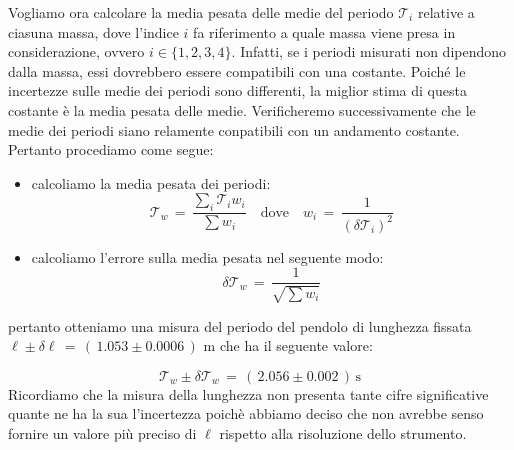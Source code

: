 Vogliamo ora calcolare la media pesata delle medie del periodo $\mathcal{T}_i$ relative a ciasuna massa, dove l'indice $i$ fa riferimento a quale massa viene presa in considerazione, ovvero $i \in \{1,2,3,4\}$.
Infatti, se i periodi misurati non dipendono dalla massa, essi dovrebbero essere compatibili con una costante.
Poiché le incertezze sulle medie dei periodi sono differenti, la miglior stima di questa costante è la media pesata delle medie.
Verificheremo successivamente che le medie dei periodi siano relamente conpatibili con un andamento costante.
Pertanto procediamo come segue:

\begin{itemize}
	\item{calcoliamo la media pesata dei periodi:
			\begin{equation*}
				\mathcal{T}_w \,=\, \frac{\sum_i \mathcal{T}_i w_i}{\sum w_i} \quad \text{dove} \quad w_i \,=\, \frac{1}{(\delta \mathcal{T}_i)^2}
			\end{equation*}
			}
	\item{calcoliamo l'errore sulla media pesata nel seguente modo:
			\begin{equation*}
				\delta \mathcal{T}_w \,=\, \frac{1}{\sqrt{\sum w_i}}
			\end{equation*}
			}
\end{itemize}
pertanto otteniamo una misura del periodo del pendolo di lunghezza fissata $\ell \pm \delta \ell \,=\, (\,1.053 \pm 0.0006\,)$ m che ha il seguente valore:

\begin{equation*}
	\mathcal{T}_w \pm \delta \mathcal{T}_w \,=\, (\,2.056 \pm 0.002\,) \, \text{s}
\end{equation*}
%
Ricordiamo che la misura della lunghezza non presenta tante cifre significative quante ne ha la sua l'incertezza poichè abbiamo deciso che non avrebbe senso fornire un valore più preciso di $\ell$ rispetto alla risoluzione dello strumento.
